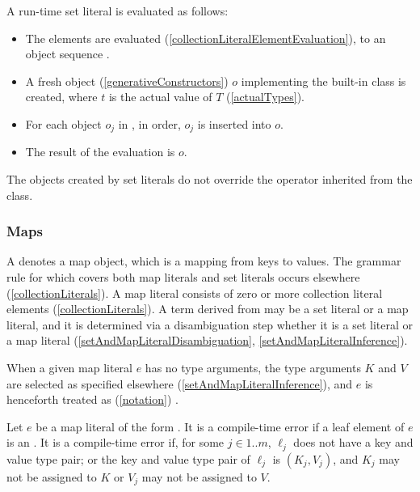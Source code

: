 \documentclass[makeidx]{article}
\begin{document}
{\LMHash{}%
A run-time set literal 
is evaluated as follows:
\begin{itemize}
\item
  The elements  are evaluated
  (\ref{collectionLiteralElementEvaluation}),
  to an object sequence .
\item
  A fresh object (\ref{generativeConstructors}) $o$
  implementing the built-in class  is created,
  where $t$ is the actual value of $T$
  (\ref{actualTypes}).
\item
  For each object $o_j$ in , in order,
  $o_j$ is inserted into $o$.
\item
  The result of the evaluation is $o$.
\end{itemize}

\LMHash{}%
The objects created by set literals do not override
the \lit{==} operator inherited from the  class.


\subsubsection{Maps}

\LMHash{}%
A  denotes a map object,
which is a mapping from keys to values.
The grammar rule for  which covers both
map literals and set literals occurs elsewhere
(\ref{collectionLiterals}).
A map literal consists of zero or more collection literal elements
(\ref{collectionLiterals}).
A term derived from 
may be a set literal or a map literal,
and it is determined via a disambiguation step
whether it is a set literal or a map literal
(\ref{setAndMapLiteralDisambiguation}, \ref{setAndMapLiteralInference}).

\LMHash{}%
When a given map literal $e$ has no type arguments,
the type arguments $K$ and $V$ are selected as specified elsewhere
(\ref{setAndMapLiteralInference}),
and $e$ is henceforth treated as
(\ref{notation})
.


\LMHash{}%
Let $e$ be a map literal of the form
.
It is a compile-time error if a leaf element of $e$ is an
.
It is a compile-time error if, for some $j \in 1 .. m$,
$\ell_j$ does not have a key and value type pair;
or the key and value type pair of $\ell_j$ is $(K_j, V_j)$,
and $K_j$ may not be assigned to $K$ or
$V_j$ may not be assigned to $V$.

}
\end{document}

